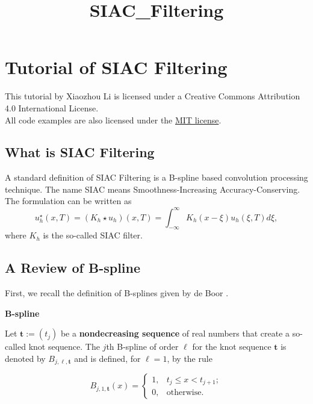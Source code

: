 \documentclass[11pt]{article}
\title{SIAC\_Filtering}
\begin{document}
    
    
    \maketitle
    
    

    
    \section{Tutorial of SIAC Filtering}\label{tutorial-of-siac-filtering}

This tutorial by Xiaozhou Li is licensed under a Creative Commons
Attribution 4.0 International License.\\
All code examples are also licensed under the
\href{http://opensource.org/licenses/MIT}{MIT license}.

    \subsection{What is SIAC Filtering}\label{what-is-siac-filtering}

A standard definition of SIAC Filtering is a B-spline based convolution
processing technique. The name SIAC means Smoothness-Increasing
Accuracy-Conserving. The formulation can be written as
\[ u_h^{\star}(x, T) = (K_h\star u_h)(x, T) = \int_{-\infty}^{\infty}K_h(x - \xi)u_h(\xi, T) d\xi, \]
where \(K_h\) is the so-called SIAC filter.

    \subsection{A Review of B-spline}\label{a-review-of-b-spline}

First, we recall the definition of B-splines given by de Boor
\cite{Boor:2001}.

\textbf{B-spline}

Let \(\mathbf{t}:= (t_j)\) be a \textbf{nondecreasing sequence} of real
numbers that create a so-called knot sequence. The \(j\)th B-spline of
order \(\ell\) for the knot sequence \(\mathbf{t}\) is denoted by
\(B_{j,\ell,\mathbf{t}}\) and is defined, for \(\ell=1\), by the rule

\begin{equation}
    B_{j,1,\mathbf{t}}(x) =
        \left\{\begin{array}{ll}
        1, & t_j \leq x < t_{j+1}; \\
        0, & \text{otherwise}.
        \end{array} \right.
\end{equation}
\end{document}
